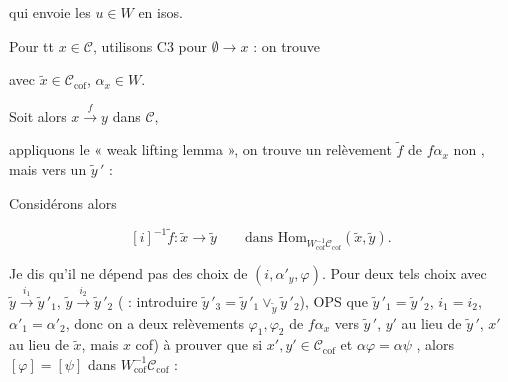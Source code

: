 \documentclass[11pt,a4paper]{article}
\begin{document}
qui envoie les $u \in W$ en isos.

Pour tt $x \in \mathcal{C}$, utilisons C3 pour $\emptyset \to x$ : on trouve


avec $\widetilde{x} \in \mathcal{C}_{\mathrm{cof}}$, $\alpha_x \in W$.

Soit alors $x \overset{f}{\longrightarrow} y$ dans $\mathcal{C}$,



appliquons le « weak lifting lemma », on trouve un relèvement $\widetilde{f}$
de $f\alpha_x$ non , mais vers un
$\widetilde{y}\,'$ :



Considérons alors

\[
[i]^{-1}\widetilde{f} : \widetilde{x} \longrightarrow \widetilde{y}
\qquad \text{dans } \mathrm{Hom}_{W_{\mathrm{cof}}^{-1}
\mathcal{C}_{\mathrm{cof}}}(\widetilde{x}, \widetilde{y}).
\]

Je dis qu'il ne dépend pas des choix de $(i, \alpha'_y, \varphi)$. Pour
deux tels choix avec $\widetilde{y} \overset{i_1}{\to} \widetilde{y}\,'_1$,
$\widetilde{y} \overset{i_2}{\to} \widetilde{y}\,'_2$ (\ill{} : introduire
$\widetilde{y}\,'_3 = \widetilde{y}\,'_1
\vee_{\widetilde{y}} \widetilde{y}\,'_2$), OPS que
$\widetilde{y}\,'_1 = \widetilde{y}\,'_2$, $i_1 = i_2$,
$\alpha'_1 = \alpha'_2$, donc on a deux relèvements $\varphi_1, \varphi_2$
de $f\alpha_x$ vers \struck{\ill{}} $\widetilde{y}\,'$,
  $y'$ au lieu de $\widetilde{y}\,'$, $x'$ au lieu de
$\widetilde{x}$, mais $x$ cof) à
prouver que si $x', y' \in \mathcal{C}_{\mathrm{cof}}$ et
$\alpha\varphi = \alpha\psi$ , alors $[\varphi] = [\psi]$
dans $W_{\mathrm{cof}}^{-1}\mathcal{C}_{\mathrm{cof}}$ :
\end{document}
